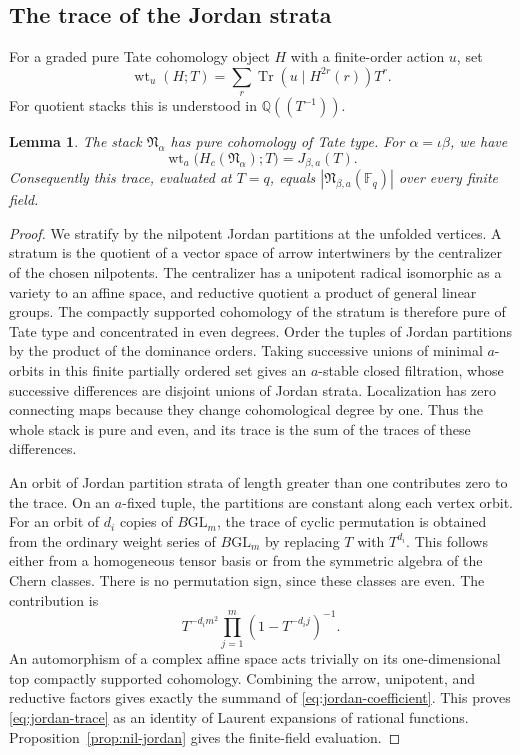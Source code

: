 \documentclass[11pt, reqno]{amsart}
\numberwithin{equation}{section}
\newtheorem{lemma}[theorem]{Lemma}
\theoremstyle{definition}
\theoremstyle{remark}
\newcommand{\op}[1]{\operatorname{#1}}
\newcommand{\mr}[1]{\mathrm{#1}}
\newcommand{\mb}[1]{\mathbb{#1}}
\newcommand{\Tr}{\op{Tr}}
\begin{document}
\subsection{The trace of the Jordan strata}

For a graded pure Tate
cohomology object $H$ with a finite-order action $u$, set
\[ \op{wt}_u(H;T)= \sum_r\Tr(u\mid H^{2r}(r))T^r. \]
For quotient stacks this is understood in $\mb Q((T^{-1}))$.

\begin{lemma}\label{lem:jordan-trace}
The stack $\mathfrak N_\alpha$ has pure cohomology of Tate type.
For $\alpha=\iota\beta$, we have
\begin{equation}\label{eq:jordan-trace} \op{wt}_a\bigl(H_c(\mathfrak N_\alpha);T\bigr) =J_{\beta,a}(T).\end{equation}
Consequently this trace, evaluated at $T=q$, equals
$|\mathfrak N_{\beta,a}(\mb F_q)|$ over every finite field.
\end{lemma}
\begin{proof}
We stratify by the nilpotent Jordan partitions at the unfolded vertices.
A stratum is the quotient of a vector space of arrow intertwiners by
the centralizer of the chosen nilpotents. The centralizer has a unipotent radical isomorphic as a variety to an
affine space, and reductive quotient a product of general linear
groups. The compactly supported cohomology of the stratum is therefore
pure of Tate type and concentrated in even degrees. Order the tuples
of Jordan partitions by the product of the dominance orders. Taking
successive unions of minimal $a$-orbits in this finite partially ordered
set gives an $a$-stable closed filtration, whose successive differences
are disjoint unions of Jordan strata. Localization has zero connecting
maps because they change cohomological degree by one. Thus the whole
stack is pure and even, and its trace is the sum of the traces of these
differences.

An orbit of Jordan partition strata of length greater than one
contributes zero to the trace. On an $a$-fixed tuple, the partitions are constant along each
vertex orbit. For an orbit of $d_i$ copies of $B\mr{GL}_m$, the trace of
cyclic permutation is obtained from the ordinary weight series of
$B\mr{GL}_m$ by replacing $T$ with $T^{d_i}$. This follows either
from a homogeneous tensor basis or from the symmetric algebra of the
Chern classes. There is no permutation sign, since these classes
are even. The contribution is
\[ T^{-d_i m^2}\prod_{j=1}^m(1-T^{-d_i j})^{-1}. \]
An automorphism of a complex affine space acts trivially on its
one-dimensional top compactly supported cohomology. Combining the
arrow, unipotent, and reductive factors gives exactly the summand
of \eqref{eq:jordan-coefficient}. This proves \eqref{eq:jordan-trace}
as an identity of Laurent expansions of rational functions. Proposition~\ref{prop:nil-jordan} gives the finite-field evaluation.
\end{proof}
\end{document}
